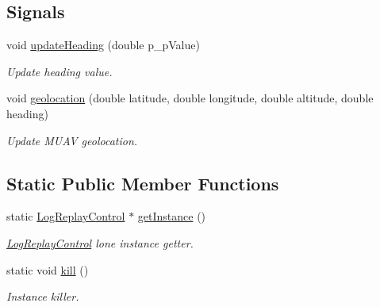 \subsection*{Signals}
\begin{DoxyCompactItemize}
\item 
void \hyperlink{class_log_replay_control_a4a8c428f2f729fea4b2681fe04183359}{update\-Heading} (double p\-\_\-p\-Value)
\begin{DoxyCompactList}\small\item\em Update heading value. \end{DoxyCompactList}\item 
void \hyperlink{class_log_replay_control_aa078de7895fc0e85f1e17d870279d558}{geolocation} (double latitude, double longitude, double altitude, double heading)
\begin{DoxyCompactList}\small\item\em Update M\-U\-A\-V geolocation. \end{DoxyCompactList}\end{DoxyCompactItemize}
\subsection*{Static Public Member Functions}
\begin{DoxyCompactItemize}
\item 
static \hyperlink{class_log_replay_control}{Log\-Replay\-Control} $\ast$ \hyperlink{class_log_replay_control_ab02cd47b56389bf7d7f6ecf2ded62372}{get\-Instance} ()
\begin{DoxyCompactList}\small\item\em \hyperlink{class_log_replay_control}{Log\-Replay\-Control} lone instance getter. \end{DoxyCompactList}\item 
static void \hyperlink{class_log_replay_control_a26685a60794a8677f19743ed370af7ee}{kill} ()
\begin{DoxyCompactList}\small\item\em Instance killer. \end{DoxyCompactList}\end{DoxyCompactItemize}


